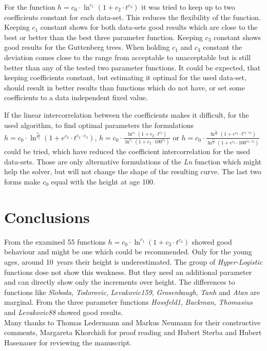 \documentclass[a4paper,twocolumn]{article}
\begin{document}
For the function $h = c_0 \cdot \ln^{c_1} (1 + c_2\cdot t^{c_3})$ it
was tried to keep up to two coefficients constant for each
data-set. This reduces the flexibility of the function. Keeping $c_1$
constant shows for both data-sets good results which are close to the
best or better than the best three parameter function. Keeping $c_3$
constant shows good results for the Guttenberg trees. When holding
$c_1$ and $c_3$ constant the deviation comes close to the range from
acceptable to unacceptable but is still better than any of the tested
two parameter functions. It could be expected, that keeping
coefficients constant, but estimating it optimal for the used
data-set, should result in better results than functions which do not
have, or set some coefficients to a data independent fixed value.

If the linear intercorrelation between the coefficients makes it
difficult, for the used algorithm, to find optimal parameters the
formulations
$h = c_0\cdot \ln^\frac{c_1}{c_2}(1 + e^{c_2} \cdot t^{c_2 \cdot c_3})$,
$h = c_0 \cdot \frac{\ln^{c_1} (1 +  c_2\cdot t^{c_3})} {\ln^{c_1} (1 + c_2\cdot 100^{c_3})}$
or
$h = c_0\cdot \frac{\ln^\frac{c_1}{c_2}(1 + e^{c_2} \cdot t^{c_2 \cdot c_3})} {\ln^\frac{c_1}{c_2}(1 + e^{c_2} \cdot 100^{c_2 \cdot c_3})}$
could be tried, which have reduced the coefficient
intercorrelation for the used data-sets. Those are only alternative
formulations of the \emph{Ln} function which might help the solver,
but will not change the shape of the resulting curve. The last two
forms make $c_0$ equal with the height at age 100.

\section{Conclusions}

From the examined 55 functions
$h  = c_0 \cdot \ln^{c_1} (1 + c_2\cdot t^{c_3})$
showed good behaviour and might be one which could be recommended.
Only for the young
ages, around 10~years their height is underestimated. The group of
\emph{Hyper-Logistic} functions dose not show this weakness. But they
need an additional parameter and can directly show only the increments
over height. The differences to functions like \emph{Sloboda},
\emph{Todorovic}, \emph{Levakovic159}, \emph{Grosenbaugh}, \emph{Tanh}
and \emph{Atan} are marginal. From the three parameter functions
\emph{Hossfeld1}, \emph{Backman}, \emph{Thomasius} and
\emph{Levakovic88} showed good results.\\[1em]

Many thanks to Thomas Ledermann and Markus Neumann for their
constructive comments, Margareta Khorchidi for proof reading and
Hubert Sterba and Hubert Hasenauer for reviewing the manuscript.




\end{document}

